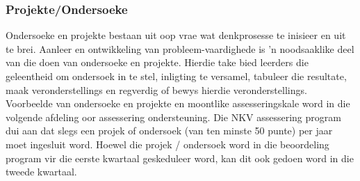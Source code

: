 \subsubsection{Projekte/Ondersoeke}

Ondersoeke en projekte bestaan ​​uit oop vrae wat denkprosesse te inisieer en uit te brei. Aanleer en ontwikkeling van probleem-vaardighede is 'n noodsaaklike deel van die doen van ondersoeke en projekte. Hierdie take bied leerders die geleentheid om ondersoek in te stel, inligting te versamel, tabuleer die resultate, maak veronderstellings en regverdig of bewys hierdie veronderstellings. Voorbeelde van ondersoeke en projekte en moontlike assesseringskale word in die volgende afdeling oor assessering ondersteuning. Die NKV assessering program dui aan dat slegs een projek of ondersoek (van ten minste 50 punte) per jaar moet ingesluit word. Hoewel die projek / ondersoek word in die beoordeling program vir die eerste kwartaal geskeduleer word, kan dit ook gedoen word in die tweede kwartaal.

